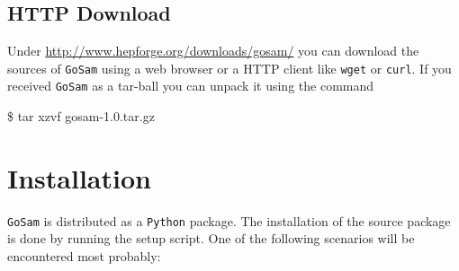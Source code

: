 \documentclass[11pt,a4paper]{refrep}
\newcommand{\golemversion}{{1{.}0}}
\newcommand{\golemv}[1][\golemversion]{{\tt GoSam}\xspace}
\newcommand{\packagename}{{gosam-\golemversion}}
\newcommand{\python}{{\tt Python}\xspace}
\begin{document}
\subsection{HTTP Download}
Under \url{http://www.hepforge.org/downloads/gosam/}
you can download the sources of \golemv{} using a web browser or a
HTTP client like \texttt{wget} or \texttt{curl}.
If you received \golemv{} as a tar-ball you can unpack it using the command
\begin{example}
\$ tar xzvf \packagename{}.tar.gz
\end{example}

\section{Installation}
\golemv{} is distributed as a \python package.
The installation of the source package is done by running
the setup script. One of the following scenarios will be
encountered most probably:
\end{document}
